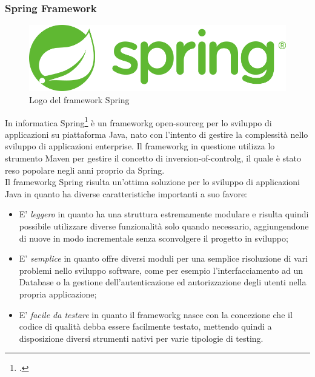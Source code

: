\subsubsection*{Spring Framework}
\begin{figure}[!h] 
    \centering 
    \includegraphics[width=0.6\columnwidth]{immagini/cap4/spring_logo.png} 
    \caption{Logo del framework Spring}
\end{figure}
\noindent In informatica Spring\footcite{spring} è un \gls{frameworkg} \gls{open-sourceg} per lo sviluppo di applicazioni su piattaforma Java, nato con l'intento di gestire la complessità nello sviluppo di applicazioni enterprise. Il \gls{frameworkg} in questione utilizza lo strumento Maven per gestire il concetto di \gls{inversion-of-controlg}, il quale è stato reso popolare negli anni proprio da Spring. \\
Il \gls{frameworkg} Spring risulta un'ottima soluzione per lo sviluppo di applicazioni Java in quanto ha diverse caratteristiche importanti a suo favore:
\begin{itemize}
    \item E' \textit{leggero} in quanto ha una struttura estremamente modulare e risulta quindi possibile utilizzare diverse funzionalità solo quando necessario, aggiungendone di nuove in modo incrementale senza sconvolgere il progetto in sviluppo;
    \item E' \textit{semplice} in quanto offre diversi moduli per una semplice risoluzione di vari problemi nello sviluppo software, come per esempio l'interfacciamento ad un Database o la gestione dell'autenticazione ed autorizzazione degli utenti nella propria applicazione;
    \item E' \textit{facile da testare} in quanto il \gls{frameworkg} nasce con la concezione che il codice di qualità debba essere facilmente testato, mettendo quindi a disposizione diversi strumenti nativi per varie tipologie di testing.
\end{itemize}



